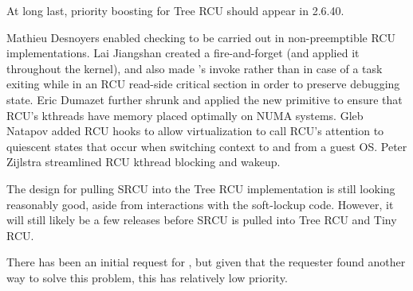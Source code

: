 At long last, priority boosting for Tree RCU should appear in 2.6.40.

Mathieu Desnoyers enabled  checking to
be carried out in non-preemptible RCU implementations.
Lai Jiangshan created a fire-and-forget  (and applied
it throughout the kernel),
and also made 's  invoke
rather than  in case of a task exiting while
in an RCU read-side critical section in order to preserve debugging
state.
Eric Dumazet further shrunk  and applied the new
 primitive to ensure that RCU's
kthreads have memory placed optimally on NUMA systems.
Gleb Natapov added RCU hooks to allow virtualization to call RCU's
attention to quiescent states that occur when switching context to
and from a guest OS.
Peter Zijlstra streamlined RCU kthread blocking and wakeup.

The design for pulling SRCU into the Tree RCU implementation is still
looking reasonably good, aside from interactions with the soft-lockup code.
However, it will still likely be a few releases before SRCU is pulled
into Tree RCU and Tiny RCU.

There has been an initial request for ,
but given that the requester found another way to solve this problem,
this has relatively low priority.
